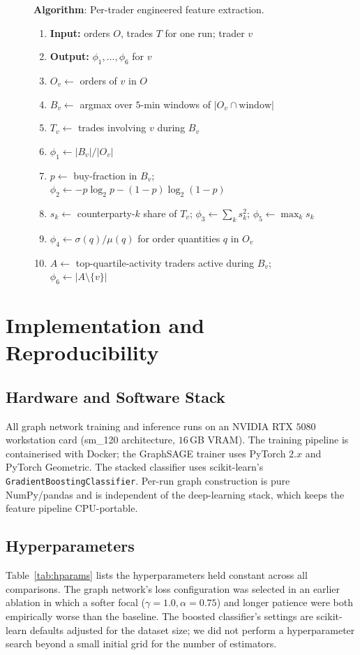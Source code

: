 \documentclass[10pt,twocolumn,letterpaper]{article}
\begin{document}
\begin{figure}[t]
\small
\noindent\textbf{Algorithm}: Per-trader engineered feature extraction.
\begin{enumerate}
\item \textbf{Input:} orders $O$, trades $T$ for one run; trader $v$
\item \textbf{Output:} $\phi_1,\dots,\phi_6$ for $v$
\item $O_v \gets$ orders of $v$ in $O$
\item $B_v \gets$ argmax over $5$-min windows of $|O_v \cap \text{window}|$
\item $T_v \gets$ trades involving $v$ during $B_v$
\item $\phi_1 \gets |B_v| / |O_v|$
\item $p \gets$ buy-fraction in $B_v$;
  $\phi_2 \gets -p\log_2 p - (1-p)\log_2(1-p)$
\item $s_k \gets$ counterparty-$k$ share of $T_v$;
  $\phi_3 \gets \sum_k s_k^2$;
  $\phi_5 \gets \max_k s_k$
\item $\phi_4 \gets \sigma(q)/\mu(q)$ for order quantities $q$ in $O_v$
\item $A \gets$ top-quartile-activity traders active during $B_v$;
  $\phi_6 \gets |A \setminus \{v\}|$
\end{enumerate}
\label{alg:feat}
\end{figure}


\section{Implementation and Reproducibility}
\label{sec:impl}
\subsection{Hardware and Software Stack}
All graph network training and inference runs on an NVIDIA RTX
\(5080\) workstation card (sm\_120 architecture, \(16\)\,GB VRAM). The
training pipeline is containerised with Docker; the GraphSAGE trainer
uses PyTorch \(2.x\) and PyTorch Geometric. The stacked classifier
uses scikit-learn's \texttt{GradientBoostingClassifier}. Per-run
graph construction is pure NumPy/pandas and is independent of the
deep-learning stack, which keeps the feature pipeline CPU-portable.

\subsection{Hyperparameters}
Table~\ref{tab:hparams} lists the hyperparameters held constant across
all comparisons. The graph network's loss configuration was selected
in an earlier ablation in which a softer focal
(\(\gamma\!=\!1.0,\alpha\!=\!0.75\)) and longer patience were both
empirically worse than the baseline. The boosted classifier's settings
are scikit-learn defaults adjusted for the dataset size; we did not
perform a hyperparameter search beyond a small initial grid for the
number of estimators.
\end{document}
